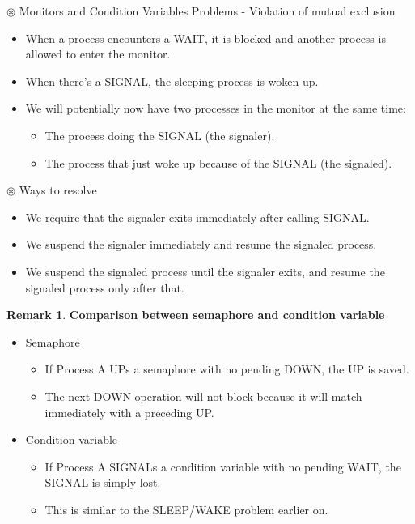 \documentclass[11pt,a4paper]{article}
\theoremstyle{definition}
\newtheorem*{remark}{Remark}
\newenvironment{myitemize}
{ \begin{itemize}
    \setlength{\itemsep}{5pt}
    \setlength{\parskip}{0pt}
    \setlength{\parsep}{0pt}     }
{ \end{itemize}                  }
\begin{document}
	\textsf{$\circledast$ Monitors and Condition Variables Problems} - Violation of mutual exclusion
	\begin{myitemize}
		\item When a process encounters a WAIT, it is blocked and another process is allowed to enter the monitor.
		\item When there’s a SIGNAL, the sleeping process is woken up.
		\item We will potentially now have two processes in the monitor at the same time:
		\begin{myitemize}
			\item The process doing the SIGNAL (the signaler).
			\item The process that just woke up because of the SIGNAL (the signaled).
		\end{myitemize}
	\end{myitemize}

	\textsf{$\circledast$ Ways to resolve}
	\begin{myitemize}
		\item We require that the signaler exits immediately after calling SIGNAL.
		\item We suspend the signaler immediately and resume the signaled process.
		\item We suspend the signaled process until the signaler exits, and resume the signaled process only after that.
	\end{myitemize}
	
\begin{remark}{\textbf{Comparison between semaphore and condition variable}}

	\begin{myitemize}
		\item \textsf{Semaphore}
		\begin{myitemize}
		\item If Process A UPs a semaphore with no pending DOWN, the UP is saved.
		\item The next DOWN operation will not block because it will match immediately with a preceding UP.
		\end{myitemize}
		\item \textsf{Condition variable}
		\begin{myitemize}
		\item If Process A SIGNALs a condition variable with no pending WAIT, the SIGNAL is simply lost.
		\item This is similar to the SLEEP/WAKE problem earlier on.
		\end{myitemize}
	\end{myitemize}
\end{remark}
\end{document}
